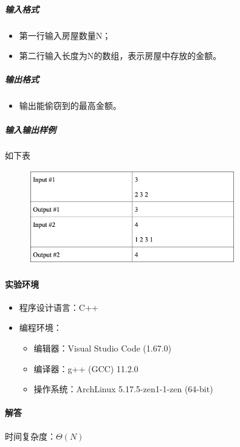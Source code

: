 \documentclass[12pt,a4paper]{ctexart}
\begin{document}
\subparagraph{输入格式}
    \begin{itemize}
        \item 第一行输入房屋数量N；
        \item 第二行输入长度为N的数组，表示房屋中存放的金额。
    \end{itemize}

\subparagraph{输出格式}
    \begin{itemize}
        \item 输出能偷窃到的最高金额。
    \end{itemize}
    
\subparagraph{输入输出样例}
如下表
    \begin{figure}[h]
        \centering
        \includegraphics[width=0.80\textwidth]{q2_iodata.png}
    \end{figure}


\vspace{5pt}

\paragraph{实验环境}
\begin{itemize}
    \item 程序设计语言：C++
    \item 编程环境：
    \begin{itemize}
        \item 编辑器：Visual Studio Code (1.67.0)
        \item 编译器：g++ (GCC) 11.2.0
        \item 操作系统：ArchLinux 5.17.5-zen1-1-zen (64-bit)
    \end{itemize}
\end{itemize}

\vspace{5pt}

\paragraph{解答}时间复杂度：$\Theta(N)$
\end{document}

